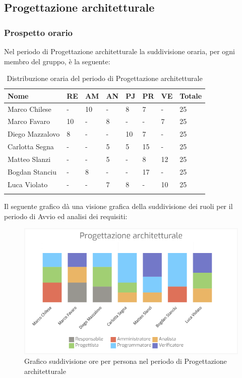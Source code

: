 \subsection{Progettazione architetturale}
\subsubsection{Prospetto orario}

Nel periodo di Progettazione architetturale la suddivisione oraria, per ogni membro del gruppo, è la seguente:


\begin{longtable}{|C{.30\textwidth}|C{.06\textwidth}|C{.06\textwidth}|C{.06\textwidth} | C{.06\textwidth}| C{.06\textwidth} | C{.06\textwidth} | C{.10\textwidth} |}
\hline
\textbf{Nome} & \textbf{RE} & \textbf{AM} & \textbf{AN} & \textbf{PJ} & \textbf{PR} & \textbf{VE} & \textbf{Totale}\\
\hline 
Marco Chilese & - & 10 & - & 8 & 7 & - & 25 \\
\hline
Marco Favaro & 10 & - & 8 & - & - & 7 & 25 \\
\hline
Diego Mazzalovo & 8 & - & - & 10 & 7 & - & 25 \\ 
\hline
Carlotta Segna & - & - & 5 & 5 & 15 & - & 25 \\
\hline
Matteo Slanzi & - & - & 5 & - & 8 & 12 & 25 \\
\hline
Bogdan Stanciu & - & 8 & - & - & 17 & - & 25 \\
\hline
Luca Violato & - & - & 7 & 8 & - & 10 & 25 \\
\hline 

\caption{Distribuzione oraria del periodo di Progettazione architetturale}
\label{Distribuzione oraria del periodo di Progettazione architetturale}
\end{longtable}

Il seguente grafico dà una visione grafica della suddivisione dei ruoli per il periodo di Avvio ed analisi dei requisiti:

\begin{figure}[H]
	\centering
  		\includegraphics[width=1\linewidth]{./images/progettazione_architetturale.png}
  		\caption{Grafico suddivisione ore per persona nel periodo di Progettazione architetturale}
  		\label{fig:grafico suddivione ruoli periodo di Progettazione architetturale}
\end{figure}



